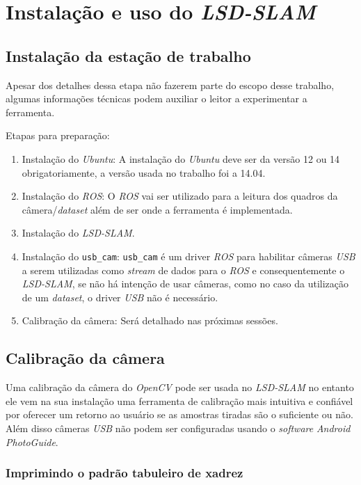 \chapter{Instalação e uso do \textit{LSD-SLAM}}

\section{Instalação da estação de trabalho}

Apesar dos detalhes dessa etapa não fazerem parte do escopo desse trabalho, algumas informações técnicas podem auxiliar o leitor a experimentar a ferramenta.

Etapas para preparação:

\begin{enumerate}
	\item{Instalação do \textit{Ubuntu}: A instalação do \textit{Ubuntu} deve ser da versão 12 ou 14 obrigatoriamente, a versão usada no trabalho foi a 14.04.}
	\item{Instalação do  \textit{ROS}: O \textit{ROS} vai ser utilizado para a leitura dos quadros da câmera/\textit{dataset} além de ser onde a ferramenta é implementada.\cite{ROS-Tutorial}}
	\item{Instalação do \textit{LSD-SLAM}.\cite{GitHub-LSD-SLAM}}
	\item{Instalação do  \texttt{usb\_cam}: \texttt{usb\_cam} é um driver \textit{ROS} para habilitar câmeras \textit{USB} a serem utilizadas como \textit{stream} de dados para o \textit{ROS} e consequentemente o \textit{LSD-SLAM}, se não há intenção de usar câmeras, como no caso da utilização de um \textit{dataset}, o driver \textit{USB} não é necessário.}
	\item{Calibração da câmera: Será detalhado nas próximas sessões.}
\end{enumerate}

\section{Calibração da câmera}

Uma calibração da câmera do \textit{OpenCV} pode ser usada no \textit{LSD-SLAM} no entanto ele vem na sua instalação uma ferramenta de calibração mais intuitiva e confiável por oferecer um retorno ao usuário se as amostras tiradas são o suficiente ou não. Além disso câmeras \textit{USB} não podem ser configuradas usando o \textit{software} \textit{Android} \textit{PhotoGuide}.

\subsection{Imprimindo o padrão tabuleiro de xadrez}

